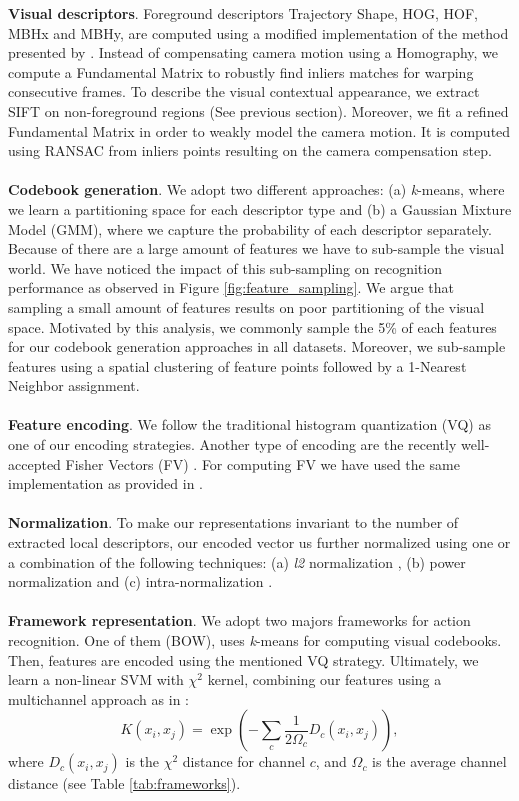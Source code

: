 \textbf{Visual descriptors}. Foreground descriptors \ie Trajectory Shape, HOG, HOF, MBHx and MBHy, are computed using a modified implementation of the method presented by \cite{wang2013}. Instead of compensating camera motion using a Homography, we compute a Fundamental Matrix to robustly find inliers matches for warping consecutive frames. To describe the visual contextual appearance, we extract SIFT \cite{lowe2004} on non-foreground regions (See previous section). Moreover, we fit a refined Fundamental Matrix in order to weakly model the camera motion. It is computed using RANSAC from inliers points resulting on the camera compensation step. \\\\
\textbf{Codebook generation}. We adopt two different approaches: (a) \textit{k}-means, where we learn a partitioning space for each descriptor type and (b) a Gaussian Mixture Model (GMM), where we capture the probability of each descriptor separately. Because of there are a large amount of features we have to sub-sample the visual world. We have noticed the impact of this sub-sampling on recognition performance as observed in Figure \ref{fig:feature_sampling}. We argue that sampling a small amount of features results on poor partitioning of the visual space. Motivated by this analysis, we commonly sample the 5\% of each features for our codebook generation approaches in all datasets. Moreover, we sub-sample features using a spatial clustering of feature points followed by a 1-Nearest Neighbor assignment. \\\\
\textbf{Feature encoding}. We follow the traditional histogram quantization (VQ) as one of our encoding strategies. Another type of encoding are the recently well-accepted Fisher Vectors (FV) \cite{perronnin2010}. For computing FV we have used the same implementation as provided in \cite{perronnin2010}. \\\\
\textbf{Normalization}. To make our representations invariant to the number of extracted local descriptors, our encoded vector us further normalized using one or a combination of the following techniques: (a) \textit{l2} normalization \cite{perronnin2010}, (b) power normalization \cite{perronnin2010} and (c) intra-normalization \cite{xwang2013}. \\\\
\textbf{Framework representation}. We adopt two majors frameworks for action recognition. One of them (BOW), uses \textit{k}-means for computing visual codebooks. Then, features are encoded using the mentioned VQ strategy. Ultimately, we learn a non-linear SVM with $\chi^2$ kernel, combining our features using a multichannel approach as in \cite{zhang2007}:
\begin{equation}
K(x_i,x_j)= \exp(-\sum_c {\frac{1}{2\Omega_c} D_c(x_i,x_j)}),
\label{eq:multichannel}
\end{equation}
where $D_c(x_i,x_j)$ is the $\chi^2$ distance for channel $c$, and $\Omega_c$ is the average channel distance (see Table \ref{tab:frameworks}).

